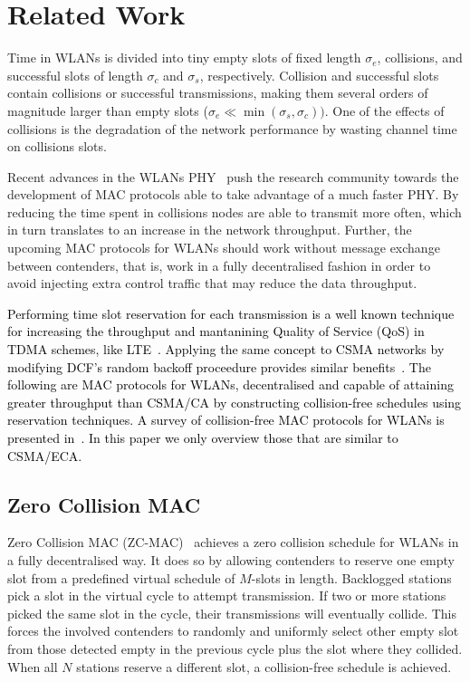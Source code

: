 \section{Related Work}\label{relatedWork}
Time in WLANs is divided into tiny empty slots of fixed length $\sigma_{e}$, collisions, and successful slots of length $\sigma_{c}$ and $\sigma_{s}$, respectively. Collision and successful slots contain collisions or successful transmissions, making them several orders of magnitude larger than empty slots ($\sigma_{e}\ll\min(\sigma_{s},\sigma_{c}))$. One of the effects of collisions is the degradation of the network performance by wasting channel time on collisions slots. 

Recent advances in the WLANs PHY~\cite{perahia2008ieee,6191306} push the research community towards the development of MAC protocols able to take advantage of a much faster PHY. By reducing the time spent in collisions nodes are able to transmit more often, which in turn translates to an increase in the network throughput. Further, the upcoming MAC protocols for WLANs should work without message exchange between contenders, that is, work in a fully decentralised fashion in order to avoid injecting extra control traffic that may reduce the data throughput.

\textcolor{black}{Performing time slot reservation for each transmission is a well known technique for increasing the throughput and mantanining Quality of Service (QoS) in TDMA schemes, like LTE~\cite{canoLTEcoexistence}. Applying the same concept to CSMA networks by modifying DCF's random backoff proceedure provides similar benefits~\cite{HE}. The following are MAC protocols for WLANs, decentralised and capable of attaining greater throughput than CSMA/CA by constructing collision-free schedules using reservation techniques. A survey of collision-free MAC protocols for WLANs is presented in~\cite{L_MAC}. In this paper we only overview those that are similar to CSMA/ECA.}

\subsection{Zero Collision MAC}\label{ZC-MAC}

Zero Collision MAC (ZC-MAC)~\cite{ZMAC} achieves a zero collision schedule for WLANs in a fully decentralised way. It does so by allowing contenders to reserve one empty slot from a predefined virtual schedule of $M$-slots in length. Backlogged stations pick a slot in the virtual cycle to attempt transmission. If two or more stations picked the same slot in the cycle, their transmissions will eventually collide. This forces the involved contenders to randomly and uniformly select other empty slot from those detected empty in the previous cycle plus the slot where they collided. When all $N$ stations reserve a different slot, a collision-free schedule is achieved.


